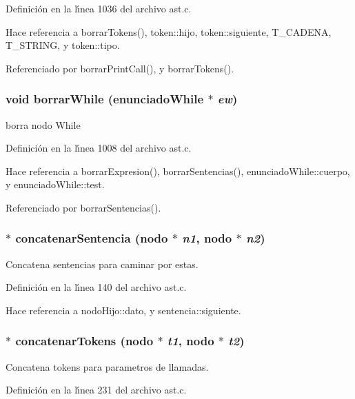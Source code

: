 Definici\'{o}n en la l\'{\i}nea 1036 del archivo ast.c.

Hace referencia a borrar\-Tokens(), token::hijo, token::siguiente, T\_\-CADENA, T\_\-STRING, y token::tipo.

Referenciado por borrar\-Print\-Call(), y borrar\-Tokens().
\subsubsection{\setlength{\rightskip}{0pt plus 5cm}void borrar\-While ({\bf enunciado\-While} $\ast$ {\em ew})}\label{ast_8c_a51}


borra nodo While 



Definici\'{o}n en la l\'{\i}nea 1008 del archivo ast.c.

Hace referencia a borrar\-Expresion(), borrar\-Sentencias(), enunciado\-While::cuerpo, y enunciado\-While::test.

Referenciado por borrar\-Sentencias().
\subsubsection{$\ast$ concatenar\-Sentencia ({\bf nodo} $\ast$ {\em n1}, {\bf nodo} $\ast$ {\em n2})}\label{ast_8c_a9}


Concatena sentencias para caminar por estas. 



Definici\'{o}n en la l\'{\i}nea 140 del archivo ast.c.

Hace referencia a nodo\-Hijo::dato, y sentencia::siguiente.
\subsubsection{$\ast$ concatenar\-Tokens ({\bf nodo} $\ast$ {\em t1}, {\bf nodo} $\ast$ {\em t2})}\label{ast_8c_a15}


Concatena tokens para parametros de llamadas. 



Definici\'{o}n en la l\'{\i}nea 231 del archivo ast.c.

